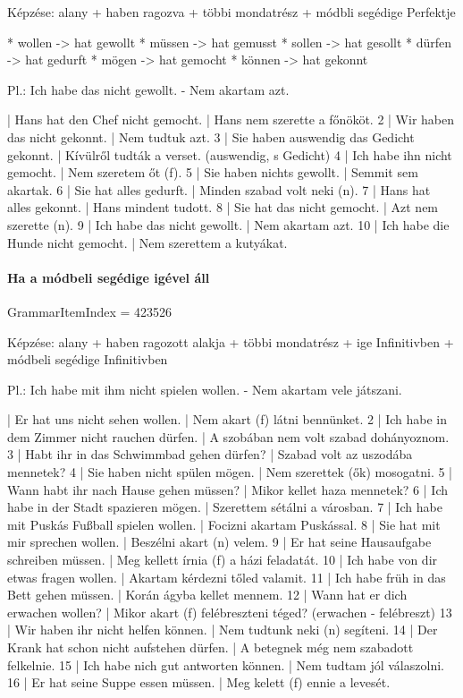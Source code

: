 \documentclass{article}
\newenvironment{desc}{\verbatim}{\endverbatim}
\newenvironment{exmp}{\verbatim}{\endverbatim}
\begin{document}
\begin{desc}
Képzése:
alany + haben ragozva + többi mondatrész + módbli segédige Perfektje

* wollen -> hat gewollt
* müssen -> hat gemusst
* sollen -> hat gesollt
* dürfen -> hat gedurft
* mögen -> hat gemocht
* können -> hat gekonnt

Pl.: Ich habe das nicht gewollt. - Nem akartam azt.
\end{desc}

\begin{exmp}
1 | Hans hat den Chef nicht gemocht. | Hans nem szerette a főnököt.
2 | Wir haben das nicht gekonnt. | Nem tudtuk azt.
3 | Sie haben auswendig das Gedicht gekonnt. | Kívülről tudták a verset. (auswendig, s Gedicht)
4 | Ich habe ihn nicht gemocht. | Nem szeretem őt (f).
5 | Sie haben nichts gewollt. | Semmit sem akartak.
6 | Sie hat alles gedurft. | Minden szabad volt neki (n).
7 | Hans hat alles gekonnt. | Hans mindent tudott.
8 | Sie hat das nicht gemocht. | Azt nem szerette (n).
9 | Ich habe das nicht gewollt. | Nem akartam azt.
10 | Ich habe die Hunde nicht gemocht. | Nem szerettem a kutyákat.
\end{exmp}

\paragraph{Ha a módbeli segédige igével áll}

GrammarItemIndex = 423526

\begin{desc}
Képzése:
alany + haben ragozott alakja + többi mondatrész + ige Infinitivben + módbeli segédige Infinitivben

Pl.: Ich habe mit ihm nicht spielen wollen. - Nem akartam vele játszani.
\end{desc}

\begin{exmp}
1 | Er hat uns nicht sehen wollen. | Nem akart (f) látni bennünket.
2 | Ich habe in dem Zimmer nicht rauchen dürfen. | A szobában nem volt szabad dohányoznom.
3 | Habt ihr in das Schwimmbad gehen dürfen? | Szabad volt az uszodába mennetek?
4 | Sie haben nicht spülen mögen. | Nem szerettek (ők) mosogatni.
5 | Wann habt ihr nach Hause gehen müssen? | Mikor kellet haza mennetek?
6 | Ich habe in der Stadt spazieren mögen. | Szerettem sétálni a városban.
7 | Ich habe mit Puskás Fußball spielen wollen. | Focizni akartam Puskással.
8 | Sie hat mit mir sprechen wollen. | Beszélni akart (n) velem.
9 | Er hat seine Hausaufgabe schreiben müssen. | Meg kellett írnia (f) a házi feladatát.
10 | Ich habe von dir etwas fragen wollen. | Akartam kérdezni tőled valamit.
11 | Ich habe früh in das Bett gehen müssen. | Korán ágyba kellet mennem.
12 | Wann hat er dich erwachen wollen? | Mikor akart (f) felébreszteni téged? (erwachen - felébreszt)
13 | Wir haben ihr nicht helfen können. | Nem tudtunk neki (n) segíteni.
14 | Der Krank hat schon nicht aufstehen dürfen. | A betegnek még nem szabadott felkelnie.
15 | Ich habe nich gut antworten können. | Nem tudtam jól válaszolni.
16 | Er hat seine Suppe essen müssen. | Meg kelett (f) ennie a levesét.
\end{exmp}
\end{document}
